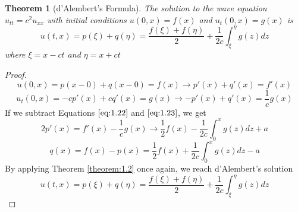 \documentclass{article}
\newtheorem{theorem}{Theorem}[section]
\theoremstyle{definition}
\begin{document}
\begin{theorem}[d'Alembert's Formula]
    The solution to the wave equation $u_{tt}=c^2u_{xx}$ with initial conditions $u(0,x)=f(x)$ and $u_t(0,x)=g(x)$ is 
    \begin{equation*}
        u(t,x) = p(\xi)+q(\eta) = \frac{f(\xi)+f(\eta)}{2}+\frac{1}{2c}\int^\eta_\xi g(z)dz 
    \end{equation*}
    where $\xi=x-ct$ and $\eta =x+ct$
\end{theorem}

\begin{proof}
    \begin{equation}
    u(0,x)=p(x-0)+q(x-0)=f(x) \rightarrow p'(x)+q'(x)=f'(x) \label{eq:1.22}
\end{equation} %
\begin{equation}
    u_t(0,x) = -cp'(x)+cq'(x) = g(x) \rightarrow-p'(x)+q'(x)=\frac{1}{c}g(x) \label{eq:1.23}
\end{equation} %
If we subtract Equations $\eqref{eq:1.22}$ and $\eqref{eq:1.23}$, we get 
\begin{equation*}
    2p'(x) = f'(x)-\frac{1}{c}g(x) \rightarrow \frac{1}{2}f(x)-\frac{1}{2c}\int^x_0g(z)dz + a 
\end{equation*}
\begin{equation*}
    q(x)=f(x)-p(x)=\frac{1}{2}f(x)+\frac{1}{2c}\int^x_0g(z)dz-a
\end{equation*}
By applying Theorem \ref{theorem:1.2} once again, we reach d'Alembert's solution
\begin{equation}
    u(t,x) = p(\xi)+q(\eta) = \frac{f(\xi)+f(\eta)}{2}+\frac{1}{2c}\int^\eta_\xi g(z)dz \label{eq:dASol}
\end{equation}
\end{proof}
\end{document}
